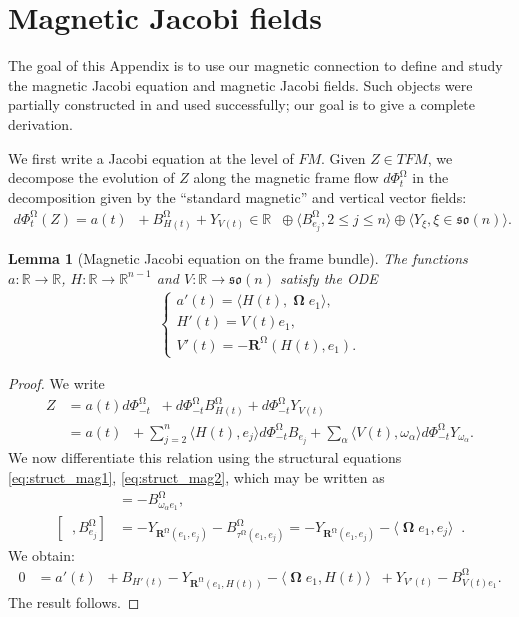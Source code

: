\documentclass[12pt]{amsart}
\numberwithin{numbering}{section}
\theoremstyle{plain}
\newtheorem{lem}[numbering]{Lemma}
\theoremstyle{definition}
\theoremstyle{remark}
\numberwithin{equation}{section}
\DeclareMathOperator{\xs}{\mathbb{X}^{\mg}}
\DeclareMathOperator{\oo}{\mathbf{\Omega}}
\DeclareMathOperator{\mg}{\Omega}
\newcommand{\rsfm}{\mathbf{R}^{\mg}}
\newcommand{\R}{\mathbb{R}}
\newcommand{\frk}[1]{\mathfrak{#1}}
\begin{document}
\appendix


\section{Magnetic Jacobi fields} \label{sec:mag_jacobi}

The goal of this Appendix is to use our magnetic connection to define and study the magnetic Jacobi equation and magnetic Jacobi fields. Such objects were partially constructed in \cite{assenza2025hopf} and used successfully; our goal is to give a complete derivation.

\smallskip

We first write a Jacobi equation at the level of $FM$. Given $Z \in TFM$, we decompose the evolution of $Z$ along the magnetic frame flow $d\Phi_t^{\mg}$ in the decomposition given by the “standard magnetic” and vertical vector fields:
\begin{align*}
d\Phi_t^{\mg}(Z) = a(t) \xs + B^{\mg}_{H(t)} + Y_{V(t)} \in \R \xs \oplus \langle B_{e_j}^{\mg}, 2 \leq j \leq n \rangle \oplus \langle Y_\xi, \xi \in \frk{so}(n) \rangle.
\end{align*}
\begin{lem}[Magnetic Jacobi equation on the frame bundle] \label{lem:mag_jacobi}
The functions $a: \R \to \R$, $H: \R \to \R^{n-1}$ and $V: \R \to \frk{so}(n)$ satisfy the ODE
\begin{align}
\begin{cases}
a'(t) = \langle H(t), \oo e_1 \rangle, \\
H'(t) = V(t) e_1, \\
V'(t) = - \rsfm(H(t), e_1).
\end{cases}
\end{align} 
\end{lem}

\begin{proof}
We write
\begin{align*}
Z &= a(t) d\Phi_{-t}^{\mg} \xs + d\Phi_{-t}^{\mg} B^{\mg}_{H(t)} + d\Phi_{-t}^{\mg} Y_{V(t)} \\
&= a(t) \xs + \sum_{j=2}^n \langle H(t), e_j \rangle d\Phi_{-t}^{\mg} B_{e_j} + \sum_\alpha \langle V(t), \omega_\alpha \rangle d\Phi_{-t}^{\mg} Y_{\omega_\alpha}.
\end{align*}
We now differentiate this relation using the structural equations \eqref{eq:struct_mag1}, \eqref{eq:struct_mag2}, which may be written as
\begin{align*}
[\xs, Y_{\omega_\alpha}] &= - B_{\omega_\alpha e_1}^{\mg}, \\
[\xs, B_{e_j}^{\mg}] &= - Y_{\rsfm(e_1, e_j)} - B^{\mg}_{\tau^{\mg}(e_1, e_j)} = - Y_{\rsfm(e_1, e_j)} - \langle \oo e_1, e_j \rangle \xs.
\end{align*}
We obtain:
\begin{align*}
0 &= a'(t) \xs + B_{H'(t)} - Y_{\rsfm(e_1, H(t))} - \langle \oo e_1, H(t) \rangle \xs + Y_{V'(t)} - B^{\mg}_{V(t)e_1}.
\end{align*}
The result follows.
\end{proof} 
\end{document}
